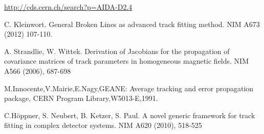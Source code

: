 \documentclass[12pt]{article}
\begin{document}


\begin{thebibliography}{99}
 \url{http://cds.cern.ch/search?p=AIDA-D2.4}

 C. Kleinwort. General Broken Lines as advanced track fitting method. NIM A673 (2012) 107-110.




  A. Strandlie, W. Wittek. Derivation of Jacobians for the propagation of covariance matrices of track parameters in homogeneous magnetic fields. NIM A566 (2006), 687-698

 M.Innocente,V.Mairie,E.Nagy,GEANE: Average tracking and error propagation package, CERN Program Library,W5013-E,1991.

 C.H\"oppner, S. Neubert, B. Ketzer, S. Paul. A novel generic framework for track fitting in complex detector systems. NIM A620 (2010), 518-525

\end{thebibliography}
\end{document}
